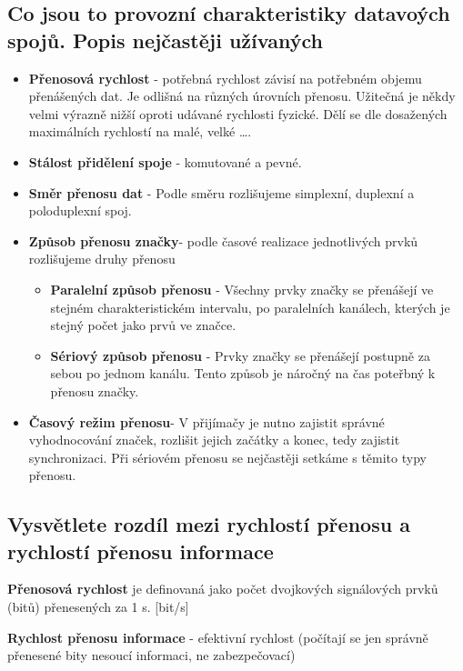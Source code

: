 \subsection{Co jsou to provozní charakteristiky datavoých spojů. Popis nejčastěji užívaných}
\begin{itemize}
    \item \textbf{Přenosová rychlost} - potřebná rychlost závisí na potřebném objemu přenášených dat.
    Je odlišná na různých úrovních přenosu.
    Užitečná je někdy velmi výrazně nižší oproti udávané rychlosti fyzické.
    Dělí se dle dosažených maximálních rychlostí na malé, velké \dots.
    \item \textbf{Stálost přidělení spoje} - komutované a pevné.
    \item \textbf{Směr přenosu dat} - Podle směru rozlišujeme simplexní, duplexní a poloduplexní spoj.
    \item \textbf{Způsob přenosu značky}- podle časové realizace jednotlivých prvků rozlišujeme druhy přenosu
    \begin{itemize}
        \item \textbf{Paralelní způsob přenosu} - Všechny prvky značky se přenášejí ve stejném charakteristickém intervalu, po paralelních kanálech, kterých je stejný počet jako prvů ve značce.
        \item \textbf{Sériový způsob přenosu} - Prvky značky se přenášejí postupně za sebou po jednom kanálu.
        Tento způsob je náročný na čas poteřbný k přenosu značky.
                
    \end{itemize}
    \item \textbf{ Časový režim přenosu}- V přijímačy je nutno zajistit správné vyhodnocování značek, rozlišit jejich začátky a konec, tedy zajistit synchronizaci.
    Při sériovém přenosu se nejčastěji setkáme s těmito typy přenosu.
\end{itemize}

\subsection{Vysvětlete rozdíl mezi rychlostí přenosu a rychlostí přenosu informace}
\textbf{Přenosová rychlost} je definovaná jako počet dvojkových signálových prvků (bitů) přenesených za 1 s. [bit/s]

\textbf{Rychlost přenosu informace} - efektivní rychlost (počítají se jen správně přenesené bity nesoucí informaci, ne zabezpečovací)

